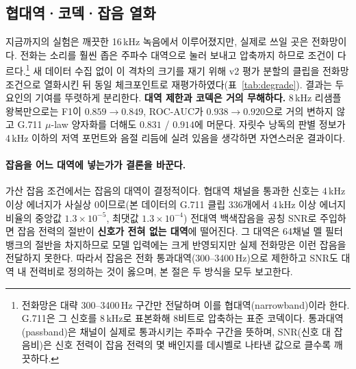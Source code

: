 \documentclass[10pt,twocolumn]{article}
\renewcommand{\emph}[1]{\textbf{#1}}
\begin{document}
\subsection{협대역·코덱·잡음 열화}\label{sec:exp:degrade}
지금까지의 실험은 깨끗한 16\,kHz 녹음에서 이루어졌지만, 실제로 쓰일 곳은 전화망이다. 전화는
소리를 훨씬 좁은 주파수 대역으로 눌러 보내고 압축까지 하므로 조건이 다르다.\footnote{전화망은
대략 300--3400\,Hz 구간만 전달하며 이를 협대역(narrowband)이라 한다. G.711은 그 신호를 8\,kHz로
표본화해 8비트로 압축하는 표준 코덱이다. 통과대역(passband)은 채널이 실제로 통과시키는 주파수
구간을 뜻하며, SNR(신호 대 잡음비)은 신호 전력이 잡음 전력의 몇 배인지를 데시벨로 나타낸 값으로
클수록 깨끗하다.} 새 데이터
수집 없이 이 격차의 크기를 재기 위해 v2 평가 분할의 클립을 전화망 조건으로 열화시킨 뒤 동일
체크포인트로 재평가하였다(표~\ref{tab:degrade}). 결과는 두 요인의 기여를 뚜렷하게 분리한다.
\emph{대역 제한과 코덱은 거의 무해하다.} 8\,kHz 리샘플 왕복만으로는 F1이 $0.859\to0.849$,
ROC-AUC가 $0.938\to0.920$으로 거의 변하지 않고 G.711 $\mu$-law 양자화를 더해도 $0.831$ /
$0.914$에 머문다. 자릿수 낭독의 판별 정보가 4\,kHz 이하의 저역 포먼트와 음절 리듬에 실려 있음을
생각하면 자연스러운 결과이다.

\paragraph{잡음을 어느 대역에 넣는가가 결론을 바꾼다.}
가산 잡음 조건에서는 잡음의 대역이 결정적이다. 협대역 채널을 통과한 신호는 4\,kHz 이상 에너지가
사실상 0이므로(본 데이터의 G.711 클립 336개에서 4\,kHz 이상 에너지 비율의 중앙값
$1.3\times10^{-5}$, 최댓값 $1.3\times10^{-4}$) 전대역 백색잡음을 공칭 SNR로 주입하면 잡음 전력의
절반이 \emph{신호가 전혀 없는 대역}에 떨어진다. 그 대역은 64채널 멜 필터뱅크의 절반을 차지하므로
모델 입력에는 크게 반영되지만 실제 전화망은 이런 잡음을 전달하지 못한다. 따라서 잡음은 전화
통과대역(300--3400\,Hz)으로 제한하고 SNR도 대역 내 전력비로 정의하는 것이 옳으며, 본 절은 두
방식을 모두 보고한다.
\end{document}
